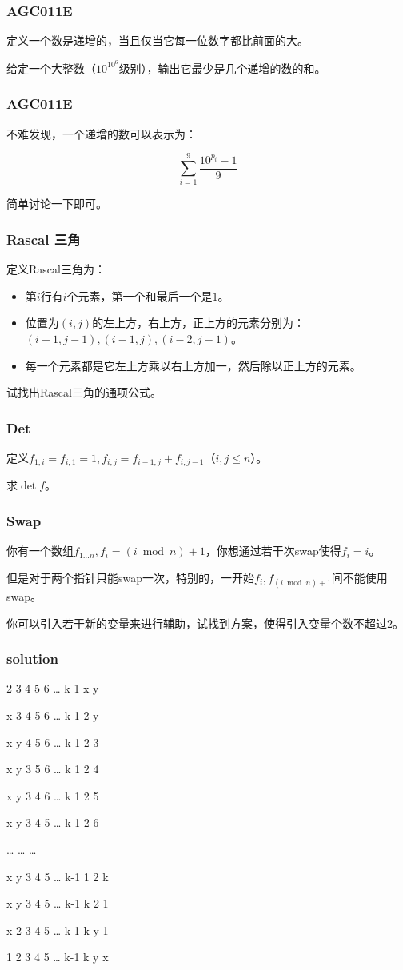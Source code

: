 \documentclass[10pt]{beamer}
\begin{document}
	\begin{frame}
		\frametitle{AGC011E}
	
		定义一个数是递增的，当且仅当它每一位数字都比前面的大。

		给定一个大整数（$10^{10^6}$级别），输出它最少是几个递增的数的和。
	
	\end{frame}
	\begin{frame}
		\frametitle{AGC011E}
	
		不难发现，一个递增的数可以表示为：

		$$
		\sum_{i=1}^9\dfrac{10^{p_i}-1}{9}
		$$

		简单讨论一下即可。
	
	\end{frame}
	\begin{frame}
		\frametitle{Rascal 三角}
	
		定义Rascal三角为：

		\begin{itemize}
			\item 第$i$行有$i$个元素，第一个和最后一个是$1$。
			\item 位置为$(i,j)$的左上方，右上方，正上方的元素分别为：$(i-1,j-1),(i-1,j),(i-2,j-1)$。
			\item 每一个元素都是它左上方乘以右上方加一，然后除以正上方的元素。
		\end{itemize}

		试找出Rascal三角的通项公式。
	
	\end{frame}
	\begin{frame}
		\frametitle{Det}
	
		定义$f_{1,i}=f_{i,1}=1,f_{i,j}=f_{i-1,j}+f_{i,j-1}$（$i,j\le n$）。

		求$\det f$。
	
	\end{frame}
	\begin{frame}
		\frametitle{Swap}
	
		你有一个数组$f_{1\dots n},f_i=(i\bmod n)+1$，你想通过若干次swap使得$f_i=i$。

		但是对于两个指针只能swap一次，特别的，一开始$f_i,f_{(i\bmod n)+1}$间不能使用swap。

		你可以引入若干新的变量来进行辅助，试找到方案，使得引入变量个数不超过$2$。
	
	\end{frame}
	\begin{frame}
		\frametitle{solution}
	
2  3  4  5  6  …  k   1  x  y 

x  3  4  5  6  …  k   1  2  y

x  y  4  5  6  …  k   1  2  3

x  y  3  5  6  …  k   1  2  4

x  y  3  4  6  …  k   1  2  5

x  y  3  4  5  …  k   1  2  6

… … …

x  y  3  4  5  … k-1  1  2  k

x  y  3  4  5  … k-1  k  2  1

x  2  3  4  5  … k-1  k  y  1

1  2  3  4  5  … k-1  k  y  x
	
	\end{frame}
\end{document}
